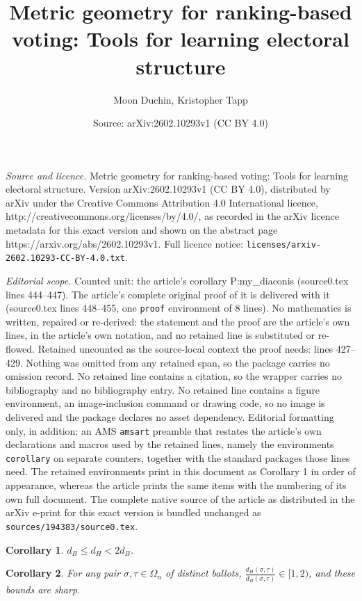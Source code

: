 \documentclass[10pt,a4paper]{amsart}
\title{Metric geometry for ranking-based voting: Tools for learning electoral structure}
\author{Moon Duchin, Kristopher Tapp}
\date{Source: arXiv:2602.10293v1 (CC BY 4.0)}
\newtheorem{corollary}{Corollary}
\begin{document}
\maketitle

\noindent\emph{Source and licence.} Metric geometry for ranking-based voting: Tools for learning electoral structure. Version arXiv:2602.10293v1 (CC BY 4.0), distributed by arXiv under the Creative Commons Attribution 4.0 International licence, http://creativecommons.org/licenses/by/4.0/, as recorded in the arXiv licence metadata for this exact version and shown on the abstract page https://arxiv.org/abs/2602.10293v1. Full licence notice: \texttt{licenses/arxiv-2602.10293-CC-BY-4.0.txt}.\par\smallskip

\noindent\textit{Editorial scope.} Counted unit: the article's corollary P:my\_diaconis (source0.tex lines 444--447). The article's complete original proof of it is delivered with it (source0.tex lines 448--455, one \texttt{proof} environment of 8 lines). No mathematics is written, repaired or re-derived: the statement and the proof are the article's own lines, in the article's own notation, and no retained line is substituted or re-flowed.  Retained uncounted as the source-local context the proof needs: lines 427--429.  Nothing was omitted from any retained span, so the package carries no omission record.  No retained line contains a citation, so the wrapper carries no bibliography and no bibliography entry.  No retained line contains a figure environment, an image-inclusion command or drawing code, so no image is delivered and the package declares no asset dependency.  Editorial formatting only, in addition: an AMS \texttt{amsart} preamble that restates the article's own declarations and macros used by the retained lines, namely the environments \texttt{corollary} on separate counters, together with the standard packages those lines need.  The retained environments print in this document as Corollary 1 in order of appearance, whereas the article prints the same items with the numbering of its own full document.  The complete native source of the article as distributed in the arXiv e-print for this exact version is bundled unchanged as \texttt{sources/194383/source0.tex}.
\begin{corollary}\label{C:hihi}
$d_B\leq d_H < 2d_B$.
\end{corollary}

\begin{corollary}\label{P:my_diaconis} For any pair $\sigma,\tau\in\Omega_n$ of distinct ballots,
$\displaystyle\frac{d_H(\sigma,\tau)}{d_B(\sigma,\tau)}\in[1,2)$,
and these bounds are sharp.
\end{corollary}
\end{document}
